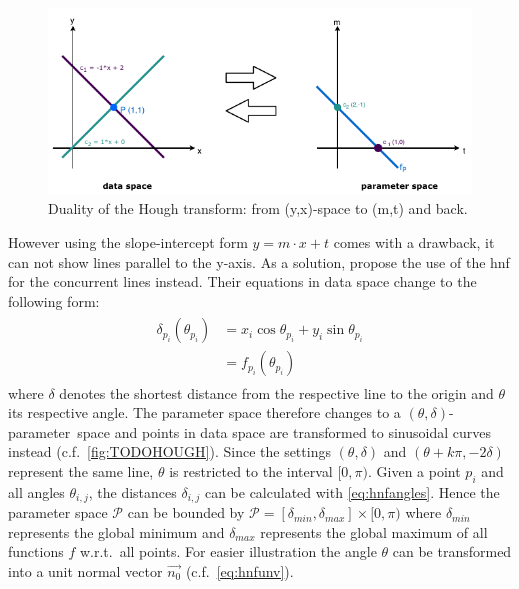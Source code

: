 \begin{figure}
    \centering
    \includegraphics{figures/HoughMXT.pdf}
    \caption{Duality of the Hough transform: from (y,x)-space to (m,t) and back.}
    \label{fig:houghmxt}
\end{figure}

However using the slope-intercept form $y = m \cdot x + t$ comes with a drawback, it can not show lines parallel to the y-axis. As a solution, \citeauthor{duda1971use} propose the use of the \gls{hnf} for the concurrent lines instead. Their equations in data space change to the following form:
\begin{align}\label{eq:hnfangles}
    \begin{split}
        \delta_{p_i}(\theta_{p_i}) &= x_i \cos{\theta_{p_i}} + y_i \sin{\theta_{p_i}}\\
        &= f_{p_i}(\theta_{p_i})
    \end{split}
\end{align}
where $\delta$ denotes the shortest distance from the respective line to the origin and $\theta$ its respective angle. The parameter space therefore changes to a \mbox{$(\theta,\delta)$-parameter space} and points in data space are transformed to sinusoidal curves instead (c.f.~\autoref{fig:TODOHOUGH}). 
Since the settings $(\theta,\delta)$ and $(\theta+k\pi,-2\delta)$ represent the same line, $\theta$ is restricted to the interval $[0,\pi)$. Given a point $p_i$ and all angles $\theta_{i,j}$, the distances $\delta_{i,j}$ can be calculated with \autoref{eq:hnfangles}. Hence the parameter space $\mathcal{P}$ can be bounded by $\mathcal{P} = [\delta_{min}, \delta_{max}]\times [0,\pi)$ where $\delta_{min}$ represents the global minimum and $\delta_{max}$ represents the global maximum of all functions $f$ w.r.t.\ all points. For easier illustration the angle $\theta$ can be transformed into a unit normal vector $\vec{n_0}$ (c.f.\ \autoref{eq:hnfunv}). 

